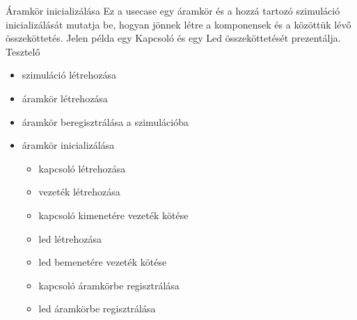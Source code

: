 \usecase
{Áramkör inicializálása}
{Ez a usecase egy áramkör és a hozzá tartozó szimuláció inicializálását mutatja be, hogyan jönnek létre a komponensek és a közöttük lévő összeköttetés. Jelen példa egy Kapcsoló és egy Led összeköttetését prezentálja.}
{Tesztelő}
{\vspace{-15pt}
\begin{itemize}
\setlength{\itemsep}{0cm}%
\setlength{\parskip}{0cm}%
\item szimuláció létrehozása
\item áramkör létrehozása
\item áramkör beregisztrálása a szimulációba
\item áramkör inicializálása
\begin{itemize}
\setlength{\itemsep}{0cm}%
\setlength{\parskip}{0cm}%
	\item kapcsoló létrehozása
	\item vezeték létrehozása
	\item kapcsoló kimenetére vezeték kötése
	\item led létrehozása
	\item led bemenetére vezeték kötése
	\item kapcsoló áramkörbe regisztrálása
	\item led áramkörbe regisztrálása
\end{itemize}
\end{itemize}
\vspace{-15pt}}

\newpage

